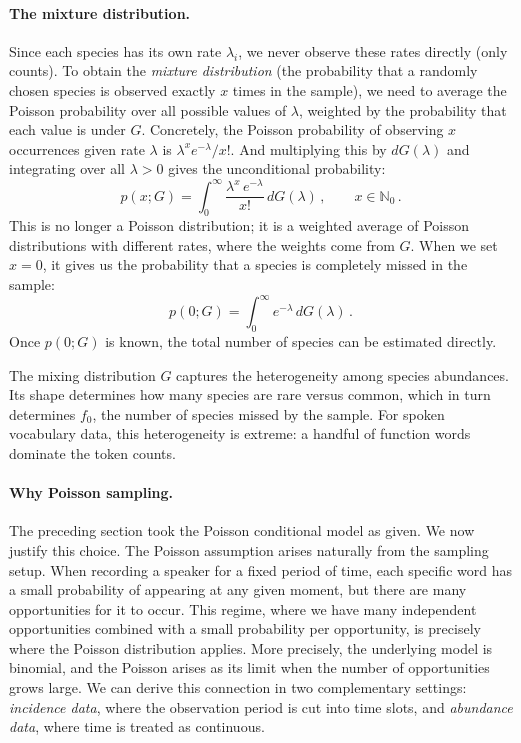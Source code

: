 ﻿\documentclass{article}
\begin{document}
\paragraph{The mixture distribution.}
Since each species has its own rate $\lambda_i$, we never observe these rates directly (only counts). To obtain the \emph{mixture distribution}  (the probability that a randomly chosen species is observed exactly $x$ times in the sample), we need to average the Poisson probability over all possible values of $\lambda$, weighted by the probability that each value is under $G$. Concretely, the Poisson probability of observing $x$ occurrences given rate $\lambda$ is $\lambda^xe^{-\lambda}/x!$. And multiplying this by $dG(\lambda)$ and integrating over all $\lambda>0$ gives the unconditional probability: 
\begin{equation}\label{eq:poisson_mixture}
    p(x; G) = \int_0^{\infty} \frac{\lambda^x \, e^{-\lambda}}{x!} 
    \, dG(\lambda)\,, \qquad x \in \mathbb{N}_0\,.
\end{equation}
This is no longer a Poisson distribution; it is a weighted average of Poisson distributions with different rates, where the weights come from $G$. When we set $x = 0$, it gives us the probability that a species is completely missed in the sample:
\begin{equation}\label{eq:p0}
    p(0; G) = \int_0^{\infty} e^{-\lambda} \, dG(\lambda)\,.
\end{equation}
Once $p(0;G)$ is known, the total number of species can be estimated directly.

\vspace{1em}

The mixing distribution $G$ captures the heterogeneity among species abundances. Its shape determines how many species are rare versus common, which in turn determines $f_0$, the number of species missed by the sample. For spoken vocabulary data, this heterogeneity is extreme: a handful of function words dominate the token counts.

\paragraph{Why Poisson sampling.}
The preceding section took the Poisson conditional model as given. We now justify this choice. The Poisson assumption arises naturally from the sampling setup. When recording a speaker for a fixed period of time, each specific word has a small probability of appearing at any given moment, but there are many opportunities for it to occur. This regime, where we have many independent opportunities combined with a small probability per opportunity, is precisely where the Poisson distribution applies. More precisely, the underlying model is binomial, and the Poisson arises as its limit when the number of opportunities grows large. We can derive this connection in two complementary settings: \emph{incidence data}, where the observation period is cut into time slots, and \emph{abundance data}, where time is treated as continuous.
\end{document}
